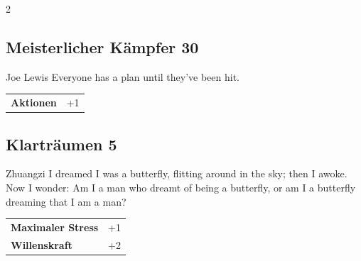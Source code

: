 \begin{multicols}{2}
\begin{tcolorbox}
\end{tcolorbox}

\begin{tcolorbox}
    \subsection*{Meisterlicher Kämpfer \hfill \small{30 }}
    \tcblower


\begin{pquote}{Joe Lewis}
Everyone has a plan until they’ve been hit.
\end{pquote}

\vspace{3mm}

\begin{tabular}{@{}ll@{}}
    \textbf{Aktionen} & +1\\
\end{tabular}


\end{tcolorbox}

\begin{tcolorbox}
    \subsection*{Klarträumen \hfill \small{5 }}
    \tcblower


\begin{pquote}{Zhuangzi}
I dreamed I was a butterfly, flitting around in the sky; then I awoke. Now I wonder: Am I a man who dreamt of being a butterfly, or am I a butterfly dreaming that I am a man?
\end{pquote}

\vspace{3mm}

\begin{tabular}{@{}ll@{}}
    \textbf{Maximaler Stress} & +1\\
    \textbf{Willenskraft} & +2\\
\end{tabular}


\end{tcolorbox}


\end{multicols}
